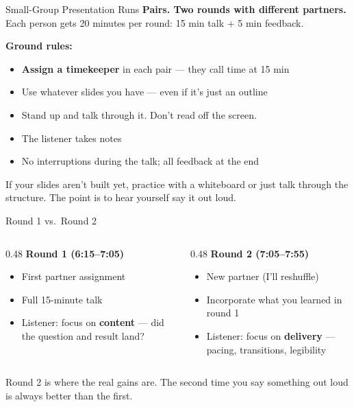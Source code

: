 \begin{frame}{Small-Group Presentation Runs}
  \textbf{Pairs. Two rounds with different partners.} Each person gets 20 minutes per round: 15 min talk + 5 min feedback.

  \vspace{8pt}

  \textbf{Ground rules:}
  \begin{itemize}\setlength\itemsep{1pt}
    \item \textbf{Assign a timekeeper} in each pair --- they call time at 15 min
    \item Use whatever slides you have --- even if it's just an outline
    \item Stand up and talk through it. Don't read off the screen.
    \item The listener takes notes
    \item No interruptions during the talk; all feedback at the end
  \end{itemize}

  \vspace{8pt}

  If your slides aren't built yet, practice with a whiteboard or just talk through the structure. The point is to hear yourself say it out loud.
\end{frame}

\begin{frame}{Round 1 vs.\ Round 2}
  \begin{columns}[T]
    \begin{column}{0.48\textwidth}
      \textbf{\textcolor{usfgreen}{Round 1 (6:15--7:05)}}
      \begin{itemize}\setlength\itemsep{1pt}
        \item First partner assignment
        \item Full 15-minute talk
        \item Listener: focus on \textbf{content} --- did the question and result land?
      \end{itemize}
    \end{column}
    \begin{column}{0.48\textwidth}
      \textbf{\textcolor{usfgreen}{Round 2 (7:05--7:55)}}
      \begin{itemize}\setlength\itemsep{1pt}
        \item New partner (I'll reshuffle)
        \item Incorporate what you learned in round 1
        \item Listener: focus on \textbf{delivery} --- pacing, transitions, legibility
      \end{itemize}
    \end{column}
  \end{columns}

  \vspace{10pt}

  Round 2 is where the real gains are. The second time you say something out loud is always better than the first.
\end{frame}

